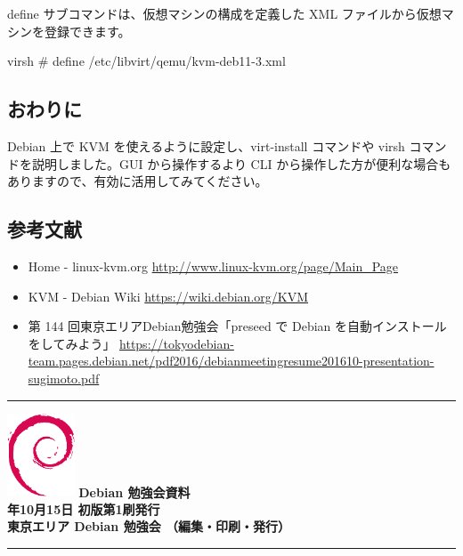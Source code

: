 \documentclass[mingoth,a4paper]{jsarticle}
\newcommand{\debmtgyear}{2022}
\newcommand{\debmtgmonth}{10}
\newcommand{\debmtgdate}{15}
\begin{document}

define サブコマンドは、仮想マシンの構成を定義した XML ファイルから仮想マシンを登録できます。

\begin{commandline}
virsh # define /etc/libvirt/qemu/kvm-deb11-3.xml
\end{commandline}


\subsection{おわりに}

Debian 上で KVM を使えるように設定し、virt-install コマンドや virsh コマンドを説明しました。GUI から操作するより CLI から操作した方が便利な場合もありますので、有効に活用してみてください。

\subsection{参考文献}

\begin{itemize}
\item Home - linux-kvm.org \url{http://www.linux-kvm.org/page/Main_Page}
\end{itemize}

\begin{itemize}
\item KVM - Debian Wiki \url{https://wiki.debian.org/KVM}
\end{itemize}

\begin{itemize}
\item 第 144 回東京エリアDebian勉強会「preseed で Debian を自動インストールをしてみよう」 \url{https://tokyodebian-team.pages.debian.net/pdf2016/debianmeetingresume201610-presentation-sugimoto.pdf}
\end{itemize}


\mbox{}\newpage
\mbox{}\newpage

\vspace*{15cm}
\hrule
\vspace{2mm}
\includegraphics[width=2cm]{image-assets/openlogo-nd.eps}
\noindent \Large \bf Debian 勉強会資料\\
\noindent \normalfont \debmtgyear{}年\debmtgmonth{}月\debmtgdate{}日 \hspace{5mm}  初版第1刷発行\\
\noindent \normalfont 東京エリア Debian 勉強会 （編集・印刷・発行）\\
\hrule
\end{document}
